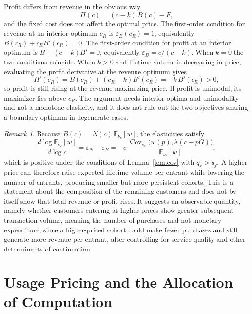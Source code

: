 \documentclass[11pt]{article}
\theoremstyle{remark}
\newtheorem{remark}{Remark}
\newcommand{\E}{\mathbb{E}}
\begin{document}
Profit differs from revenue in the obvious way,
\[
\Pi(c)=(c-k)\,B(c)-F,
\]
and the fixed cost does not affect the optimal price. The first-order condition for revenue at an interior optimum $c_R$ is $\varepsilon_B(c_R)=1$, equivalently $B(c_R)+c_RB'(c_R)=0$. The first-order condition for profit at an interior optimum is $B+(c-k)B'=0$, equivalently $\varepsilon_B=c/(c-k)$. When $k=0$ the two conditions coincide. When $k>0$ and lifetime volume is decreasing in price, evaluating the profit derivative at the revenue optimum gives
\[
\Pi'(c_R)=B(c_R)+(c_R-k)B'(c_R)=-k\,B'(c_R)>0,
\]
so profit is still rising at the revenue-maximizing price. If profit is unimodal, its maximizer lies above $c_R$. The argument needs interior optima and unimodality and not a monotone elasticity, and it does not rule out the two objectives sharing a boundary optimum in degenerate cases.

\begin{remark}
Because $B(c)=N(c)\,\E_{\nu_c}[w]$, the elasticities satisfy
\[
\frac{d\log\E_{\nu_c}[w]}{d\log c}=\varepsilon_N-\varepsilon_B=-c\,\frac{\operatorname{Cov}_{\nu_c}\bigl(w(p),\lambda(c-pG)\bigr)}{\E_{\nu_c}[w]} ,
\]
which is positive under the conditions of Lemma~\ref{lem:cov} with $q_s>q_f$. A higher price can therefore raise expected lifetime volume per entrant while lowering the number of entrants, producing smaller but more persistent cohorts. This is a statement about the composition of the remaining customers and does not by itself show that total revenue or profit rises. It suggests an observable quantity, namely whether customers entering at higher prices show greater subsequent transaction volume, meaning the number of purchases and not monetary expenditure, since a higher-priced cohort could make fewer purchases and still generate more revenue per entrant, after controlling for service quality and other determinants of continuation.
\end{remark}

\section{Usage Pricing and the Allocation of Computation}\label{sec:usage}
\end{document}

